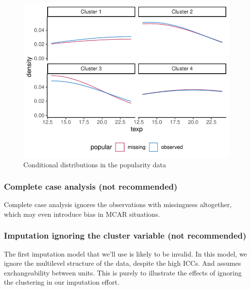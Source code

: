 \documentclass[
]{jss}
\begin{document}
\begin{CodeChunk}
\begin{figure}

{\centering \includegraphics{Imputation_of_Incomplete_Multilevel_Data_files/figure-latex/pop_dist-1} 

}

\caption[Conditional distributions in the popularity data]{Conditional distributions in the popularity data}\label{fig:pop_dist}
\end{figure}
\end{CodeChunk}

\hypertarget{complete-case-analysis-not-recommended}{%
\subsubsection{Complete case analysis (not
recommended)}\label{complete-case-analysis-not-recommended}}

Complete case analysis ignores the observations with missingness
altogether, which may even introduce bias in MCAR situations.

\hypertarget{imputation-ignoring-the-cluster-variable-not-recommended}{%
\subsubsection{Imputation ignoring the cluster variable (not
recommended)}\label{imputation-ignoring-the-cluster-variable-not-recommended}}

The first imputation model that we'll use is likely to be invalid. In
this model, we ignore the multilevel structure of the data, despite the
high ICCs. And assumes exchangeability between units. This is purely to
illustrate the effects of ignoring the clustering in our imputation
effort.
\end{document}
